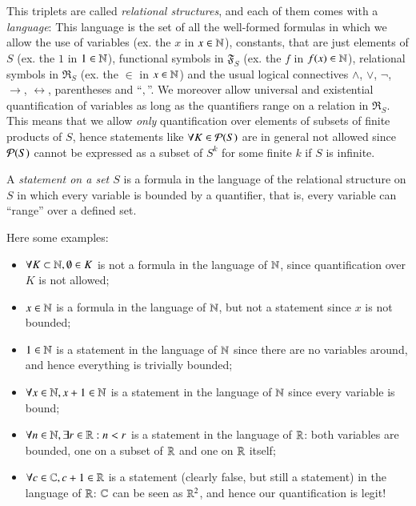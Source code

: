 \documentclass[adraft, copyright,creativecommons,sharealike,noncommercial]{Preambles/eptcs}
\begin{document}
This triplets are called \emph{relational structures}, and each of them comes with a \emph{language}: 
This language is the set of all the well-formed formulas in which we allow the use of variables (ex. the $x$ in $x \in \mathbb{N}$), constants, that are just elements of $S$ (ex. the $1$ in $1 \in \mathbb{N}$), functional symbols in $\mathfrak{F}_S$ (ex. the $f$ in $f(x) \in \mathbb{N}$), relational symbols in $\mathfrak{R}_S$ (ex. the $\in$ in $x \in \mathbb{N}$) and the usual logical connectives $\wedge$, $\vee$, $\neg$, $\to$, $\leftrightarrow$, parentheses and ``$,$''. We moreover allow universal and existential quantification of variables as long as the quantifiers range on a relation in $\mathfrak{R}_S$.
This means that we allow \emph{only} quantification over elements of subsets of finite products of $S$, hence statements like $\forall K \in \mathcal{P}(S)$ are in general not allowed since $\mathcal{P}(S)$ cannot be expressed as a subset of $S^k$ for some finite $k$ if $S$ is infinite.

A \emph{statement on a set $S$} is a formula in the language of the relational structure on $S$ in which every variable is bounded by a quantifier, that is, every variable can ``range'' over a defined set.
\begin{example}
	Here some examples:
	\begin{itemize}
		\item $\forall K \subset \mathbb{N}, \emptyset \in K$ is not a formula in the language of $\mathbb{N}$, since quantification over $K$ is not allowed;
		\item $x \in \mathbb{N}$ is a formula in the language of $\mathbb{N}$, but not a statement since $x$ is not bounded;
		\item $1 \in \mathbb{N}$ is a statement in the language of $\mathbb{N}$ since there are no variables around, and hence everything is trivially bounded;
		\item $\forall x \in \mathbb{N}, x+1 \in \mathbb{N}$ is a statement in the language of $\mathbb{N}$ since every variable is bound;
		\item $\forall n \in \mathbb{N}, \exists r \in \mathbb{R} : n<r$ is a statement in the language of $\mathbb{R}$: both variables are bounded, one on a subset of $\mathbb{R}$ and one on $\mathbb{R}$ itself;
		\item $\forall c \in \mathbb{C}, c+1 \in \mathbb{R}$ is a statement (clearly false, but still a statement) in the language of $\mathbb{R}$: $\mathbb{C}$ can be seen as $\mathbb{R}^2$, and hence our quantification is legit!
	\end{itemize}
\end{example}
%
%
\end{document}
